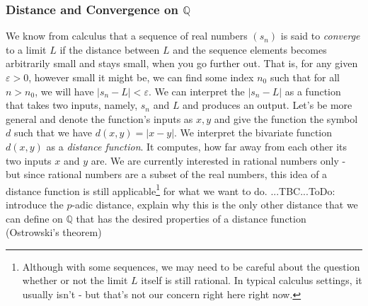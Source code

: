\subsubsection{Distance and Convergence on $\mathbb{Q}$}
We know from calculus that a sequence of real numbers $(s_n)$ is said to \emph{converge} to a limit $L$ if the distance between $L$ and the sequence elements becomes arbitrarily small and stays small, when you go further out. That is, for any given $\varepsilon > 0$, however small it might be, we can find some index $n_0$ such that for all $n > n_0$, we will have $|s_n - L| < \varepsilon$. We can interpret the $|s_n - L|$ as a function that takes two inputs, namely, $s_n$ and $L$ and produces an output. Let's be more general and denote the function's inputs as $x,y$ and give the function the symbol $d$ such that we have $d(x,y) = |x-y|$. We interpret the bivariate function $d(x,y)$ as a \emph{distance function}. It computes, how far away from each other its two inputs $x$ and $y$ are. We are currently interested in rational numbers only - but since rational numbers are a subset of the real numbers, this idea of a distance function is still applicable\footnote{Although with some sequences, we may need to be careful about the question whether or not the limit $L$ itself is still rational. In typical calculus settings, it usually isn't - but that's not our concern right here right now.} for what we want to do. ...TBC...ToDo: introduce the $p$-adic distance, explain why this is the only other distance that we can define on $\mathbb{Q}$ that has the desired properties of a distance function (Ostrowski's theorem)







